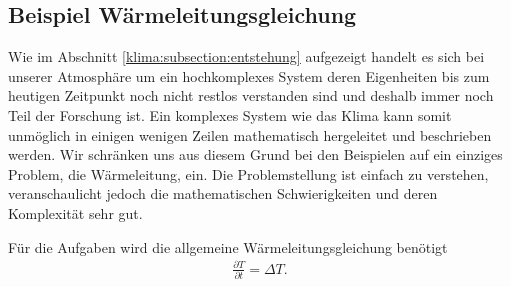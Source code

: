 \begin{refsection}
\subsection{Beispiel Wärmeleitungsgleichung}
Wie im Abschnitt \ref{klima:subsection:entstehung}  aufgezeigt handelt es sich bei unserer Atmosphäre um ein hochkomplexes System deren Eigenheiten bis zum heutigen Zeitpunkt noch nicht restlos verstanden sind und deshalb immer noch Teil der Forschung ist. Ein komplexes System wie das Klima kann somit unmöglich in einigen wenigen Zeilen mathematisch hergeleitet und beschrieben werden. Wir schränken uns aus diesem Grund bei den Beispielen auf ein einziges Problem, die Wärmeleitung, ein. Die Problemstellung ist einfach zu verstehen, veranschaulicht jedoch die mathematischen Schwierigkeiten und deren Komplexität sehr gut.

Für die Aufgaben wird die allgemeine Wärmeleitungsgleichung benötigt
\begin{align}
\frac{\partial T}{\partial t} =  \Delta T.
\label{klima:bsp:pdgl}
\end{align}




\end{refsection}
